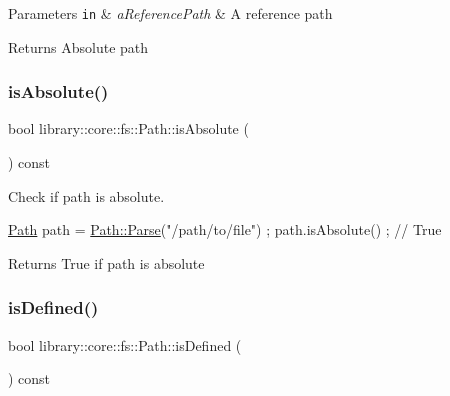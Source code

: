 \begin{DoxyParams}[1]{Parameters}
\mbox{\tt in}  & {\em a\+Reference\+Path} & A reference path \\
\hline
\end{DoxyParams}
\begin{DoxyReturn}{Returns}
Absolute path 
\end{DoxyReturn}
\mbox{\label{classlibrary_1_1core_1_1fs_1_1_path_a9a5772dfc1273a74137ca301e9a84d61}} 
\subsubsection{\texorpdfstring{is\+Absolute()}{isAbsolute()}}
{\footnotesize\ttfamily bool library\+::core\+::fs\+::\+Path\+::is\+Absolute (\begin{DoxyParamCaption}{ }\end{DoxyParamCaption}) const}



Check if path is absolute. 


\begin{DoxyCode}
\hyperlink{classlibrary_1_1core_1_1fs_1_1_path_aabc4240fc08479d1bff6b9753f2b5cc2}{Path} path = \hyperlink{classlibrary_1_1core_1_1fs_1_1_path_a6ba644b6609507e724c217bf2020f5ae}{Path::Parse}(\textcolor{stringliteral}{"/path/to/file"}) ;
path.isAbsolute() ; \textcolor{comment}{// True}
\end{DoxyCode}


\begin{DoxyReturn}{Returns}
True if path is absolute 
\end{DoxyReturn}
\mbox{\label{classlibrary_1_1core_1_1fs_1_1_path_a4315cfd12f61bf477e010f33122c3d0c}} 
\subsubsection{\texorpdfstring{is\+Defined()}{isDefined()}}
{\footnotesize\ttfamily bool library\+::core\+::fs\+::\+Path\+::is\+Defined (\begin{DoxyParamCaption}{ }\end{DoxyParamCaption}) const}



